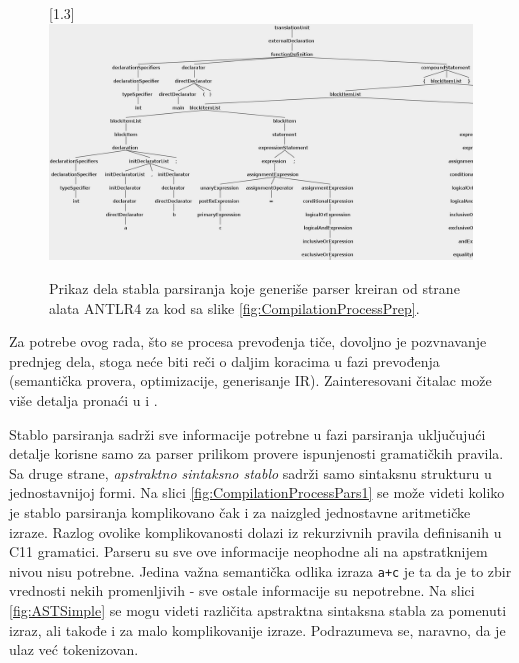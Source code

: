 \begin{figure}[h!]
    \centering
    \scalebox{0.95}[1.3] {
        \includegraphics[width=\textwidth]{images/parse_tree.png}
    }
    \caption{Prikaz dela stabla parsiranja koje generiše parser kreiran od strane alata ANTLR4 za kod sa slike \ref{fig:CompilationProcessPrep}.}
    \label{fig:CompilationProcessPars}
\end{figure}

Za potrebe ovog rada, što se procesa prevođenja tiče, dovoljno je pozvnavanje prednjeg dela, stoga neće biti reči o daljim koracima u fazi prevođenja (semantička provera, optimizacije, generisanje IR). Zainteresovani čitalac može više detalja pronaći u \cite{EngineeringCompilers} i \cite{CompilerConstruction}. 

Stablo parsiranja sadrži sve informacije potrebne u fazi parsiranja uključujući detalje korisne samo za parser prilikom provere ispunjenosti gramatičkih pravila. Sa druge strane, \emph{apstraktno sintaksno stablo} sadrži samo sintaksnu strukturu u jednostavnijoj formi. Na slici \ref{fig:CompilationProcessPars1} se može videti koliko je stablo parsiranja komplikovano čak i za naizgled jednostavne aritmetičke izraze. Razlog ovolike komplikovanosti dolazi iz rekurzivnih pravila definisanih u C11 gramatici. Parseru su sve ove informacije neophodne ali na apstratknijem nivou nisu potrebne. Jedina važna semantička odlika izraza \texttt{a+c} je ta da je to zbir vrednosti nekih promenljivih - sve ostale informacije su nepotrebne. Na slici \ref{fig:ASTSimple} se mogu videti različita apstraktna sintaksna stabla za pomenuti izraz, ali takođe i za malo komplikovanije izraze. Podrazumeva se, naravno, da je ulaz već tokenizovan. 

